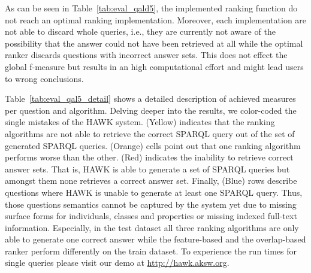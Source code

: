 \begin{table}[tb!]
\centering
\caption{Results of the QALD-5 challenge for different ranking algorithms. Number in brackets show the amount of generated answers, i.e., HAWK outputs at least one result set.}
\label{tab:eval_qald5}
\end{table}

As can be seen in Table~\ref{tab:eval_qald5}, the implemented ranking function do not reach an optimal ranking implementation.
Moreover, each implementation are not able to discard whole queries, i.e., they are currently not aware of the possibility that the answer could not have been retrieved at all while the optimal ranker discards questions with incorrect answer sets. 
This does not effect the global f-measure but results in an high computational effort and might lead users to wrong conclusions. 

Table~\ref{tab:eval_qal5_detail} shows a detailed description of achieved measures per question and algorithm. 
Delving deeper into the results, we color-coded the single mistakes of the HAWK system.
(Yellow) indicates that the ranking algorithms are not able to retrieve the correct SPARQL query out of the set of generated SPARQL queries. 
(Orange) cells point out that one ranking algorithm performs worse than the other. 
(Red) indicates the inability to retrieve correct answer sets.
That is, HAWK is able to generate a set of SPARQL queries but amongst them none retrieves a correct answer set.
Finally, (Blue) rows describe questions where HAWK is unable to generate at least one SPARQL query.
Thus, those questions semantics cannot be captured by the system yet due to missing surface forms for individuals, classes and properties or missing indexed full-text information.
Especially, in the test dataset all three ranking algorithms are only able to generate one correct answer while the feature-based and the overlap-based ranker perform differently on the train dataset.
To experience the run times for single queries please visit our demo at \url{http://hawk.aksw.org}.

